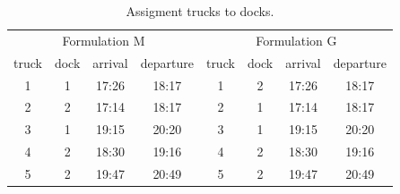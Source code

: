 \documentclass[preprint,12pt,authoryear]{elsarticle}
\begin{document}
\begin{table}[h]
    \centering
    
    \begin{subtable}{0.90\linewidth}
        \centering        
           \begin{tabular}{| c | c | c | c || c | c | c | c |}
           \hline
            \multicolumn{4}{|c||}{Formulation M}  & \multicolumn{4}{c|}{Formulation G} \\
            \cline{1-4}  \cline{5-8}
            truck &dock & arrival &  departure & truck &dock & arrival &  departure\\
           \hline
                1 &    1 & 17:26 & 18:17        & 1   &  2 & 17:26 & 18:17 \\
                2 &    2 & 17:14 & 18:17        & 2   &  1 & 17:14 & 18:17 \\
                3 &    1 & 19:15 & 20:20        & 3   &  1 & 19:15 & 20:20 \\
                4 &    2  & 18:30 & 19:16       & 4   &  2 & 18:30 & 19:16 \\
                5 &    2  & 19:47 & 20:49       & 5   &  2 & 19:47 & 20:49 \\
                 \hline
           \end{tabular}
           \caption{Assigment trucks to docks.}
           \label{tab:didacOptSol}
    \end{subtable}
    \vspace{5mm}


\end{table}
\end{document}
